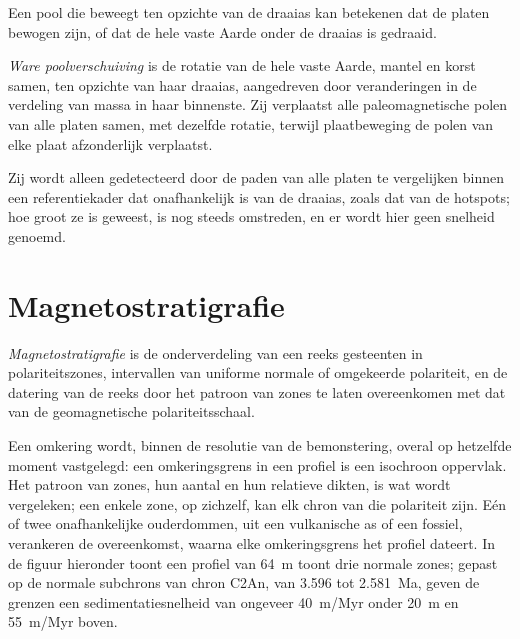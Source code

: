 Een pool die beweegt ten opzichte van de draaias kan betekenen dat de platen bewogen zijn, of
dat de hele vaste Aarde onder de draaias is gedraaid.

\begin{definition}\label{def:b3:palaeomagnetism:tpw}
\emph{Ware poolverschuiving} is de rotatie van de hele
vaste Aarde, mantel en korst samen, ten opzichte van haar draaias, aangedreven
door veranderingen in de verdeling van massa in haar binnenste. Zij verplaatst alle
paleomagnetische polen van alle platen samen, met dezelfde rotatie, terwijl
plaatbeweging de polen van elke plaat afzonderlijk verplaatst.
\end{definition}

Zij wordt alleen gedetecteerd door de paden van alle platen te vergelijken binnen een
referentiekader dat onafhankelijk is van de draaias, zoals dat van de hotspots; hoe groot ze
is geweest, is nog steeds omstreden, en er wordt hier geen snelheid genoemd.

\section{Magnetostratigrafie}

\begin{definition}[Magnetostratigrafie]\label{def:b3:palaeomagnetism:magnetostratigraphy}
\emph{Magnetostratigrafie} is de onderverdeling van een reeks
gesteenten in polariteitszones, intervallen van uniforme normale of omgekeerde polariteit, en
de datering van de reeks door het patroon van zones te laten overeenkomen met dat van de
geomagnetische polariteitsschaal.
\end{definition}

Een omkering wordt, binnen de resolutie van de bemonstering, overal
op hetzelfde moment vastgelegd: een omkeringsgrens in een profiel is een isochroon oppervlak.
Het patroon van zones, hun aantal en hun relatieve dikten, is wat wordt
vergeleken; een enkele zone, op zichzelf, kan elk chron van die polariteit zijn. Eén of twee
onafhankelijke ouderdommen, uit een vulkanische as of een fossiel, verankeren de overeenkomst, waarna
elke omkeringsgrens het profiel dateert. In de figuur hieronder toont een profiel van
\qty{64}{m} toont drie normale zones; gepast op de normale subchrons van
chron C2An, van 3.596 tot \qty{2.581}{Ma}, geven de grenzen een sedimentatiesnelheid
van ongeveer \qty{40}{m/Myr} onder \qty{20}{m} en \qty{55}{m/Myr} boven.

